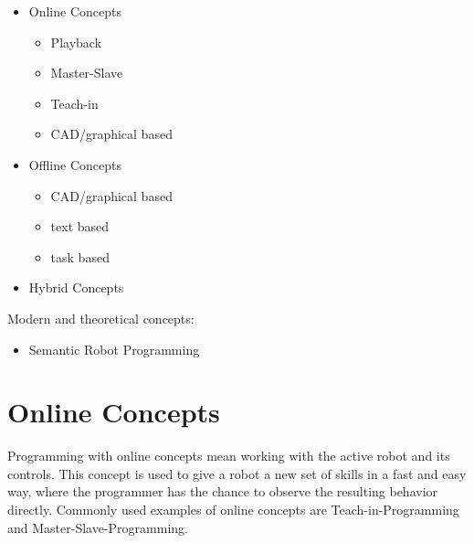 \documentclass[conference]{IEEEtran}
\begin{document}
 \begin{itemize}
    \item Online Concepts
        \begin{itemize}
            \item Playback
            \item Master-Slave
            \item Teach-in
            \item CAD/graphical based
        \end{itemize}
    \item Offline Concepts
        \begin{itemize}
            \item CAD/graphical based
            \item text based
            \item task based
        \end{itemize}
    \item Hybrid Concepts
 \end{itemize}    

Modern and theoretical concepts:

\begin{itemize}
    \item Semantic Robot Programming
\end{itemize}

\section{Online Concepts}

Programming with online concepts mean working with the active robot and its controls. %
This concept is used to give a robot a new set of skills in a fast and easy way, where the programmer has the chance to observe the resulting behavior directly.
Commonly used examples of online concepts are Teach-in-Programming and Master-Slave-Programming. %

\end{document}
